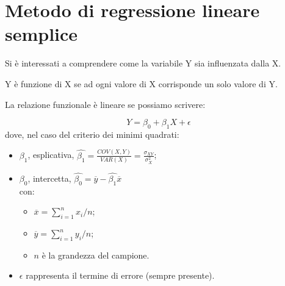 \section{Metodo di regressione lineare semplice}
Si è interessati a comprendere come la variabile Y sia influenzata dalla X.

Y è funzione di X se ad ogni valore di X corrisponde un solo valore di Y.

La relazione funzionale è lineare se possiamo scrivere:

\[ Y = \beta_0 + \beta_1 X + \epsilon \]
dove, nel caso del criterio dei minimi quadrati:
\begin{itemize}
 \item $\beta_1$, esplicativa, $\hat{\beta_1} = 
\frac{COV(X,Y)}{VAR(X)} = \frac{\sigma_{XY}}{\sigma^2_{X}}$;
 \item $\beta_0$, intercetta, $\hat{\beta_0} = \overline{y} - \hat{\beta_1} 
\overline{x}$ \\
  con:
  \begin{itemize}
   \item $\overline{x} = \sum_{i=1}^n x_i/n $;
   \item $\overline{y} = \sum_{i=1}^n y_i/n $;
   \item $n$ \`e la grandezza del campione.
  \end{itemize}

 \item $\epsilon$ rappresenta il termine di errore (sempre presente).
\end{itemize}

